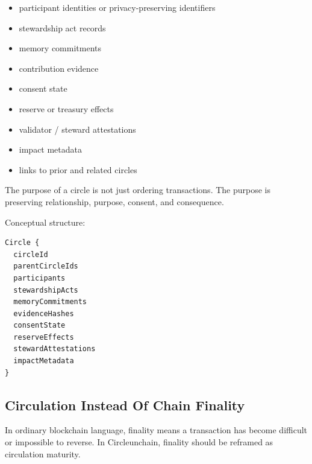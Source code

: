 ﻿\documentclass[12pt]{article}
\begin{document}
\begin{itemize}
  \item participant identities or privacy-preserving identifiers
\end{itemize}
\begin{itemize}
  \item stewardship act records
\end{itemize}
\begin{itemize}
  \item memory commitments
\end{itemize}
\begin{itemize}
  \item contribution evidence
\end{itemize}
\begin{itemize}
  \item consent state
\end{itemize}
\begin{itemize}
  \item reserve or treasury effects
\end{itemize}
\begin{itemize}
  \item validator / steward attestations
\end{itemize}
\begin{itemize}
  \item impact metadata
\end{itemize}
\begin{itemize}
  \item links to prior and related circles
\end{itemize}

The purpose of a circle is not just ordering transactions. The purpose is preserving relationship, purpose, consent, and consequence.

Conceptual structure:

\begin{verbatim}
Circle {
  circleId
  parentCircleIds
  participants
  stewardshipActs
  memoryCommitments
  evidenceHashes
  consentState
  reserveEffects
  stewardAttestations
  impactMetadata
}
\end{verbatim}

\subsection{Circulation Instead Of Chain Finality}


In ordinary blockchain language, finality means a transaction has become difficult or impossible to reverse. In Circleunchain, finality should be reframed as circulation maturity.
\end{document}
